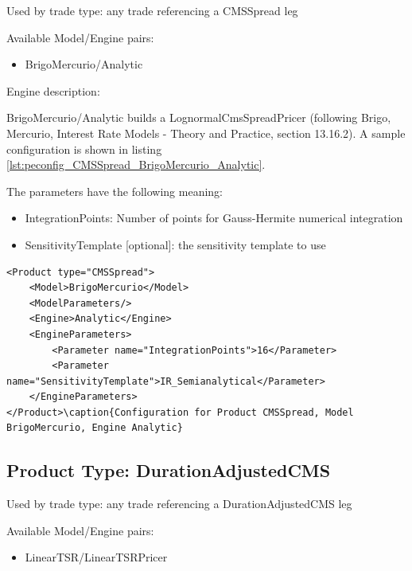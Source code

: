Used by trade type: any trade referencing a CMSSpread leg

Available Model/Engine pairs:

\begin{itemize}
  \item BrigoMercurio/Analytic
\end{itemize}

Engine description:

BrigoMercurio/Analytic builds a LognormalCmsSpreadPricer (following Brigo, Mercurio, Interest Rate Models - Theory and
Practice, section 13.16.2). A sample configuration is shown in listing
\ref{lst:peconfig_CMSSpread_BrigoMercurio_Analytic}.

The parameters have the following meaning:

\begin{itemize}
\item IntegrationPoints: Number of points for Gauss-Hermite numerical integration
\item SensitivityTemplate [optional]: the sensitivity template to use
\end{itemize}

\begin{longlisting}
\begin{verbatim}
<Product type="CMSSpread">
    <Model>BrigoMercurio</Model>
    <ModelParameters/>
    <Engine>Analytic</Engine>
    <EngineParameters>
        <Parameter name="IntegrationPoints">16</Parameter>
        <Parameter name="SensitivityTemplate">IR_Semianalytical</Parameter>
    </EngineParameters>
</Product>\caption{Configuration for Product CMSSpread, Model BrigoMercurio, Engine Analytic}
\end{verbatim}
\caption{Configuration for Product CMSSpread, Model BrigoMercurio, Engine Analytic}
\label{lst:peconfig_CMSSpread_BrigoMercurio_Analytic}
\end{longlisting}

\subsection{Product Type: DurationAdjustedCMS}

Used by trade type: any trade referencing a DurationAdjustedCMS leg

Available Model/Engine pairs:

\begin{itemize}
  \item LinearTSR/LinearTSRPricer
\end{itemize}

